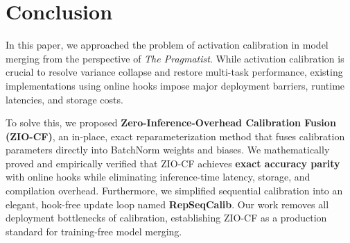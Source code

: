 \documentclass{article}
\begin{document}
\section{Conclusion}
In this paper, we approached the problem of activation calibration in model merging from the perspective of \textit{The Pragmatist}. While activation calibration is crucial to resolve variance collapse and restore multi-task performance, existing implementations using online hooks impose major deployment barriers, runtime latencies, and storage costs.

To solve this, we proposed \textbf{Zero-Inference-Overhead Calibration Fusion (ZIO-CF)}, an in-place, exact reparameterization method that fuses calibration parameters directly into BatchNorm weights and biases. We mathematically proved and empirically verified that ZIO-CF achieves \textbf{exact accuracy parity} with online hooks while eliminating inference-time latency, storage, and compilation overhead. Furthermore, we simplified sequential calibration into an elegant, hook-free update loop named \textbf{RepSeqCalib}. Our work removes all deployment bottlenecks of calibration, establishing ZIO-CF as a production standard for training-free model merging.



\end{document}
